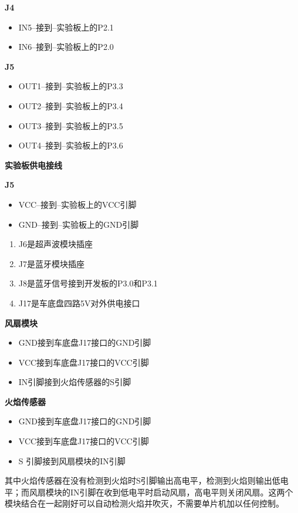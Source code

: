 \textbf{J4}
\begin{itemize}
    \item IN5--接到--实验板上的P2.1
    \item IN6--接到--实验板上的P2.0
\end{itemize}

\textbf{J5}
\begin{itemize}
    \item OUT1--接到--实验板上的P3.3
    \item OUT2--接到--实验板上的P3.4
    \item OUT3--接到--实验板上的P3.5
    \item OUT4--接到--实验板上的P3.6
\end{itemize}

\textbf{实验板供电接线}

\textbf{J5}
\begin{itemize}
    \item VCC--接到--实验板上的VCC引脚
    \item GND--接到--实验板上的GND引脚
\end{itemize}
\begin{enumerate}
    \item J6是超声波模块插座
    \item J7是蓝牙模块插座
    \item J8是蓝牙信号接到开发板的P3.0和P3.1
    \item J17是车底盘四路5V对外供电接口
\end{enumerate}

\textbf{风扇模块}
\begin{itemize}
    \item GND接到车底盘J17接口的GND引脚
    \item VCC接到车底盘J17接口的VCC引脚
    \item IN引脚接到火焰传感器的S引脚
\end{itemize}

\textbf{火焰传感器}
\begin{itemize}
    \item GND接到车底盘J17接口的GND引脚
    \item VCC接到车底盘J17接口的VCC引脚
    \item  S 引脚接到风扇模块的IN引脚
\end{itemize}

其中火焰传感器在没有检测到火焰时S引脚输出高电平，检测到火焰则输出低电平；而风扇模块的IN引脚在收到低电平时启动风扇，高电平则关闭风扇。这两个模块结合在一起刚好可以自动检测火焰并吹灭，不需要单片机加以任何控制。








